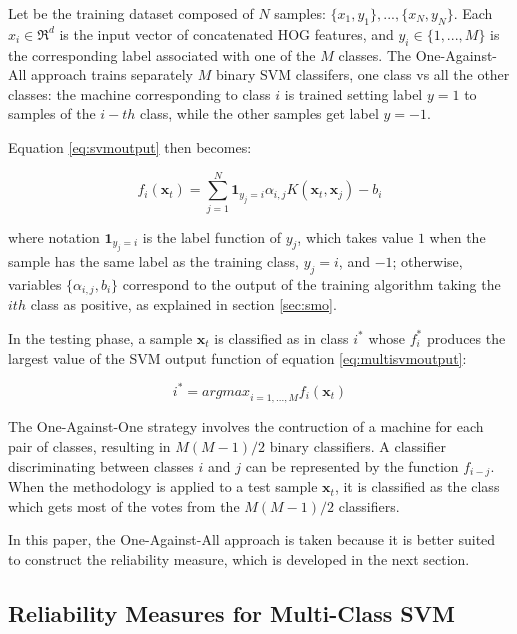 \documentclass{ipol}
\def\x{{\mathbf x}}
\begin{document}
Let be the training dataset composed of $N$ samples: $\{x_1,y_1\}, ...,\{x_N,y_N\}$.
Each $x_i \in \Re^d$ is the input vector of concatenated HOG features, and $y_i \in \{1,...,M\}$ is the corresponding label associated with one of the $M$ classes.
The One-Against-All approach trains separately $M$ binary SVM classifers, one class vs all the other classes: the machine corresponding to class $i$ is trained setting label $y=1$ to samples of the $i-th$ class, while the other samples get label $y=-1$.

Equation \ref{eq:svmoutput} then becomes:

\begin{equation}\label{eq:multisvmoutput}
f_i(\x_t)=\sum_{j=1}^N \mathbf{1}_{y_j=i} \alpha_{i,j} K(\x_t,\x_j)-b_i
\end{equation}

\noindent where notation $\mathbf{1}_{y_j=i}$ is the label function of $y_j$, which takes value $1$ when the sample has the same label as the training class, $y_j=i$, and $-1$; otherwise, variables $\{\alpha_{i,j},b_i\}$ correspond to the output of the training algorithm taking the $ith$ class as positive, as explained in section \ref{sec:smo}.

In the testing phase, a sample $\x_t$ is classified as in class $i^*$ whose $f_i^*$ produces the largest value of the SVM output function of equation \ref{eq:multisvmoutput}:

\begin{equation} \label{eq:multisvmclassif}
i^*= {argmax}_{i=1,...,M} f_i(\x_t)
\end{equation}


The One-Against-One strategy involves the contruction of a machine for each pair of classes, resulting in $M(M-1)/2$ binary classifiers.
A classifier discriminating between classes $i$ and $j$ can be represented by the function $f_{i-j}$.
When the methodology is applied to a test sample $\x_t$, it is classified as the class which gets most of the votes from the $M(M-1)/2$ classifiers.

In this paper, the One-Against-All approach is taken because it is better suited to construct the reliability measure, which is developed in the next section.

\subsection{Reliability Measures for Multi-Class SVM}
\end{document}
